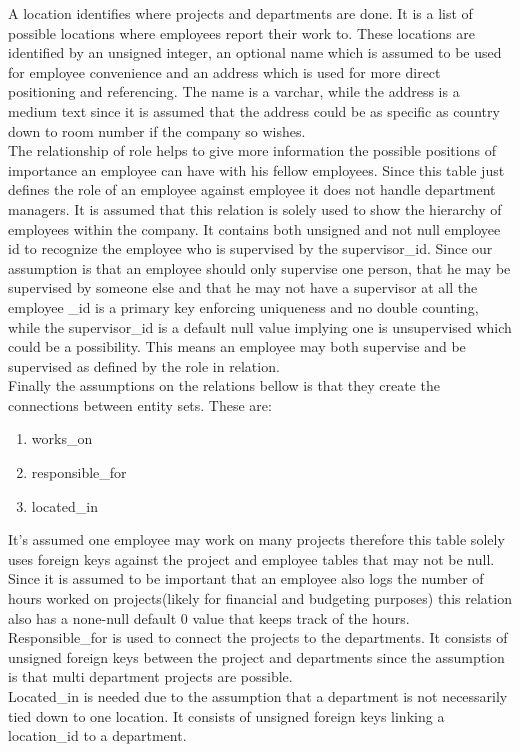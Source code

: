 \documentclass[11pt,letterpaper]{article}
\begin{document}
A location identifies where projects and departments are done. It is a list of possible locations where employees report their work to. These locations are identified by an unsigned integer, an optional name which is assumed to be used for employee convenience and an address which is used for more direct positioning and referencing. The name is a varchar, while the address is a medium text since it is assumed that the address could be as specific as country down to room number if the company so wishes.\\

The relationship of role helps to give more information the possible positions of importance an employee can have with his fellow employees. Since this table just defines the role of an employee against employee it does not handle department managers. It is assumed that this relation is solely used to show the hierarchy of employees within the company. It contains both unsigned and not null employee id to recognize the employee who is supervised by the supervisor\_id. Since our assumption is that an employee should only supervise one person, that he may be supervised by someone else and that he may not have a supervisor at all the employee \_id is a primary key enforcing uniqueness and no double counting, while the supervisor\_id is a default null value implying one is unsupervised which could be a possibility. This means an employee may both supervise and be supervised as defined by the role in relation.\\

Finally the assumptions on the relations bellow is that they create the connections between entity sets. These are:
\begin{enumerate}[]
	\item works\_on
	\item responsible\_for
	\item located\_in
\end{enumerate}
It's assumed one employee may work on many projects therefore this table solely uses foreign keys against the project and employee tables that may not be null. Since it is assumed to be important that an employee also logs the number of hours worked on projects(likely for financial and budgeting purposes) this relation also has a none-null default 0 value that keeps track of the hours.\\

Responsible\_for is used to connect the projects to the departments. It consists of unsigned foreign keys between the project and departments since the assumption is that multi department projects are possible.\\

Located\_in is needed due to the assumption that a department is not necessarily tied down to one location. It consists of unsigned foreign keys linking a location\_id to a department.

	
\end{document}
